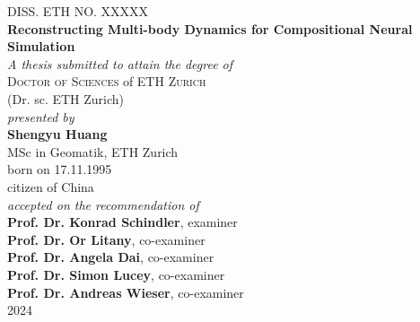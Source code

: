 
\begin{center}
	\large{DISS. ETH NO. XXXXX}\\
\vspace{2 cm}
	\Large{\textbf{Reconstructing Multi-body Dynamics for Compositional Neural Simulation}}\\
\vspace{1.5 cm}
	\large{\emph{A thesis submitted to attain the degree of}}\\
\vspace{0.5cm}
	\large{\textsc{Doctor of Sciences} of \textsc{ETH Zurich}}\\
\vspace{0.5cm}
	\large{(Dr. sc. ETH Zurich)}\\
\vspace{1.5cm}
	\large{\emph{presented by}}\\
\vspace{0.5cm}
	\large{\textbf{Shengyu Huang}}\\
\vspace{0.3cm}
	\large{MSc in Geomatik, ETH Zurich}\\
\vspace{0.3cm}
	\large{born on 17.11.1995}\\
\vspace{0.3cm}
	\large{citizen of China}\\
\vspace{1.5cm}
	\large{\emph{accepted on the recommendation of}}\\
\vspace{0.5cm}
	\large{\textbf{Prof. Dr. Konrad Schindler}, examiner %
}\\
\vspace{0.1cm}
	\large{\textbf{Prof. Dr. Or Litany}, co-examiner %
}\\
\vspace{0.1cm}
	\large{\textbf{Prof. Dr. Angela Dai}, co-examiner %
}\\
\vspace{0.1cm}
	\large{\textbf{Prof. Dr. Simon Lucey}, co-examiner %
}\\
\vspace{0.1cm}
	\large{\textbf{Prof. Dr. Andreas Wieser}, co-examiner %
}\\

\vspace{1.5cm}
	\large{2024}
\end{center}


